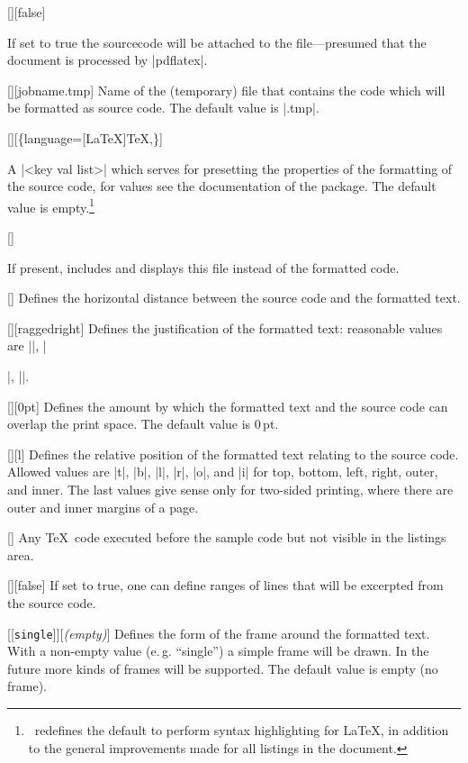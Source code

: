 \documentclass{ltxguidex}
\newcommand{\ltx}{\ltxclass{ltxguidex}}
\begin{document}
\begin{keys}
	[\bool][false]

	If set to true the sourcecode will be attached to the
	 file---presumed that the document is processed by
	|pdflatex|.

	[][\bs jobname.tmp]
	Name of the (temporary) file that contains the code which will be
	formatted as source code. The default value is |\jobname.tmp|.

	[][\{language=[LaTeX]TeX,\}]

	A |<key val list>| which serves for presetting the properties of the
	formatting of the source code, for values see the documentation of
	the  package. The default value is
	empty.\footnote{\ltx\ redefines the default to perform syntax
	highlighting for \LaTeX, in addition to the general improvements
	made for all listings in the document.}

	[]

	If present, includes and displays this file instead of the formatted
	code.

	[]
	Defines the horizontal distance between the source code and the
	formatted text.

	[][\bs raggedright]
	Defines the justification of the formatted text: reasonable values
	are |\raggedleft|, |\raggedright|, |\centering|.

	[][0pt]
	Defines the amount by which the formatted text and the source code
	can overlap the print space. The default value is 0\,pt.

	[][l]
	Defines the relative position of the formatted text relating to the
	source code. Allowed values are |t|, |b|, |l|, |r|, |o|, and |i| for
	top, bottom, left, right, outer, and inner. The last values give
	sense only for two-sided printing, where there are outer and inner
	margins of a page.

	[]
	Any \TeX\ code executed before the sample code but not visible in
	the listings area.

	[\bool][false]
	If set to  true, one can define ranges of lines that will be
	excerpted from the source code.

	[[\texttt{single}]][\textrm{\textit{(empty)}}]
	Defines the form of the frame around the formatted text. With a
	non-empty value (e.\,g. ``single'') a simple frame will be drawn. In
	the future more kinds of frames will be supported. The default value
	is empty (no frame).


\end{keys}
\end{document}
